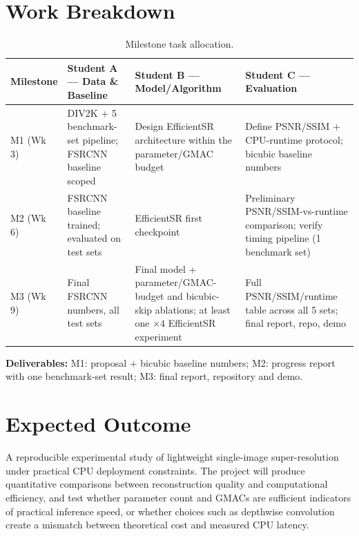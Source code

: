 \documentclass[11pt,a4paper]{article}
\begin{document}
\section{Work Breakdown}
\label{sec:workbreakdown}

\begin{table}[H]
\centering
\caption{Milestone task allocation.}
\label{tab:tasks}
\small
\setlength{\tabcolsep}{3pt}
\renewcommand{\arraystretch}{1.15}

\begin{tabularx}{\textwidth}{@{}p{}X X X@{}}
\toprule
\textbf{Milestone} &
\textbf{Student A --- Data \& Baseline} &
\textbf{Student B --- Model/Algorithm} &
\textbf{Student C --- Evaluation} \\
\midrule

M1 (Wk 3) &
DIV2K + 5 benchmark-set pipeline; FSRCNN baseline scoped &
Design EfficientSR architecture within the parameter/GMAC budget &
Define PSNR/SSIM + CPU-runtime protocol; bicubic baseline numbers \\

M2 (Wk 6) &
FSRCNN baseline trained; evaluated on test sets &
EfficientSR first checkpoint &
Preliminary PSNR/SSIM-vs-runtime comparison; verify timing pipeline
(1 benchmark set) \\

M3 (Wk 9) &
Final FSRCNN numbers, all test sets &
Final model + parameter/GMAC-budget and bicubic-skip ablations; at least one
$\times4$ EfficientSR experiment &
Full PSNR/SSIM/runtime table across all 5 sets; final report, repo, demo \\

\bottomrule
\end{tabularx}
\end{table}

\noindent
\textbf{Deliverables:} M1: proposal + bicubic baseline numbers; M2: progress
report with one benchmark-set result; M3: final report, repository and demo.
\section{Expected Outcome}

A reproducible experimental study of lightweight single-image
super-resolution under practical CPU deployment constraints. The project
will produce quantitative comparisons between reconstruction quality and
computational efficiency, and test whether parameter count and GMACs are
sufficient indicators of practical inference speed, or whether choices such
as depthwise convolution create a mismatch between theoretical cost and
measured CPU latency.
\end{document}
